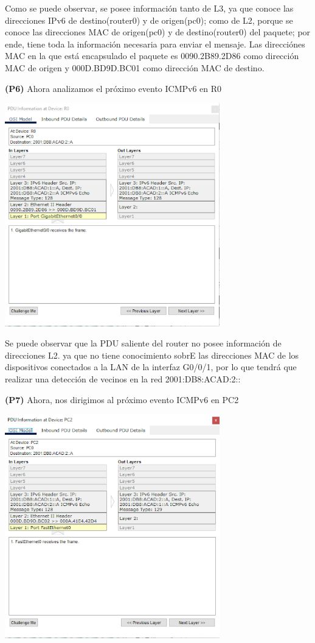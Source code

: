 \documentclass[12pt]{article}
\begin{document}
 Como se puede observar, se posee información tanto de L3, ya que conoce las direcciones IPv6 de destino(router0) y de origen(pc0); como de L2, porque se conoce las direcciones MAC de origen(pc0) y de destino(router0) del paquete; por ende, tiene toda la información necesaria para enviar el mensaje. Las direcciónes MAC en la que está encapsulado el paquete es 0090.2B89.2D86 como dirección MAC de origen y 000D.BD9D.BC01 como dirección MAC de destino.
 
 \textbf{(P6)} Ahora analizamos el próximo evento ICMPv6 en R0
 
 \begin{center}
 	\includegraphics[width=0.7\textwidth]{../tpipv6/imagenes/imagen3}
 \end{center}
 
  Se puede observar que la PDU saliente del router no posee información de direcciones L2. ya que no tiene conocimiento sobrE las direcciones MAC de los dispositivos conectados a la LAN de la interfaz G0/0/1, por lo que tendrá que realizar una detección de vecinos en la red  2001:DB8:ACAD:2::
 
 \textbf{(P7)} Ahora, nos dirigimos al próximo evento ICMPv6 en PC2
 
 \begin{center}
 	\includegraphics[width=0.7\textwidth]{../tpipv6/imagenes/imagen4}
 \end{center}
 
\end{document}
